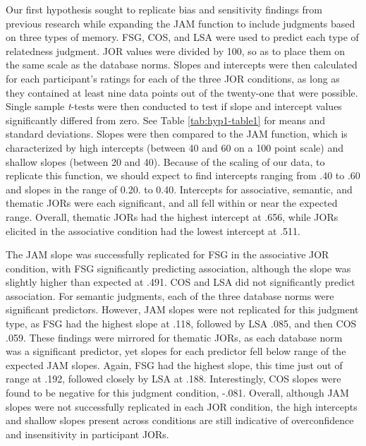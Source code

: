 \documentclass[english,man]{apa6}
\theoremstyle{definition}
\theoremstyle{definition}
\theoremstyle{definition}
\theoremstyle{remark}
\begin{document}
Our first hypothesis sought to replicate bias and sensitivity findings
from previous research while expanding the JAM function to include
judgments based on three types of memory. FSG, COS, and LSA were used to
predict each type of relatedness judgment. JOR values were divided by
100, so as to place them on the same scale as the database norms. Slopes
and intercepts were then calculated for each participant's ratings for
each of the three JOR conditions, as long as they contained at least
nine data points out of the twenty-one that were possible. Single sample
\emph{t}-tests were then conducted to test if slope and intercept values
significantly differed from zero. See Table \ref{tab:hyp1-table1} for
means and standard deviations. Slopes were then compared to the JAM
function, which is characterized by high intercepts (between 40 and 60
on a 100 point scale) and shallow slopes (between 20 and 40). Because of
the scaling of our data, to replicate this function, we should expect to
find intercepts ranging from .40 to .60 and slopes in the range of 0.20.
to 0.40. Intercepts for associative, semantic, and thematic JORs were
each significant, and all fell within or near the expected range.
Overall, thematic JORs had the highest intercept at .656, while JORs
elicited in the associative condition had the lowest intercept at .511.

The JAM slope was successfully replicated for FSG in the associative JOR
condition, with FSG significantly predicting association, although the
slope was slightly higher than expected at .491. COS and LSA did not
significantly predict association. For semantic judgments, each of the
three database norms were significant predictors. However, JAM slopes
were not replicated for this judgment type, as FSG had the highest slope
at .118, followed by LSA .085, and then COS .059. These findings were
mirrored for thematic JORs, as each database norm was a significant
predictor, yet slopes for each predictor fell below range of the
expected JAM slopes. Again, FSG had the highest slope, this time just
out of range at .192, followed closely by LSA at .188. Interestingly,
COS slopes were found to be negative for this judgment condition, -.081.
Overall, although JAM slopes were not successfully replicated in each
JOR condition, the high intercepts and shallow slopes present across
conditions are still indicative of overconfidence and insensitivity in
participant JORs.
\end{document}
